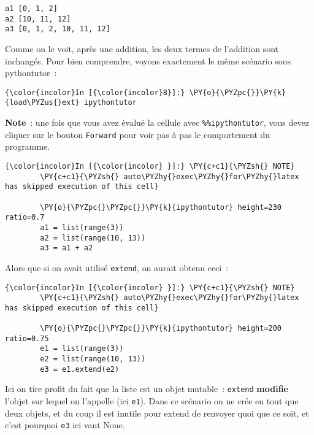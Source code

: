     \begin{Verbatim}[commandchars=\\\{\},frame=single,framerule=0.3mm,rulecolor=\color{cellframecolor}]
a1 [0, 1, 2]
a2 [10, 11, 12]
a3 [0, 1, 2, 10, 11, 12]
\end{Verbatim}

    Comme on le voit, après une addition, les deux termes de l'addition sont
inchangés. Pour bien comprendre, voyons exactement le même scénario sous
pythontutor~:

    \begin{Verbatim}[commandchars=\\\{\},frame=single,framerule=0.3mm,rulecolor=\color{cellframecolor}]
{\color{incolor}In [{\color{incolor}8}]:} \PY{o}{\PYZpc{}}\PY{k}{load\PYZus{}ext} ipythontutor
\end{Verbatim}


    \textbf{Note}~: une fois que vous avez évalué la cellule avec
\texttt{\%\%ipythontutor}, vous devez cliquer sur le bouton
\texttt{Forward} pour voir pas à pas le comportement du programme.

    \begin{Verbatim}[commandchars=\\\{\},frame=single,framerule=0.3mm,rulecolor=\color{cellframecolor}]
{\color{incolor}In [{\color{incolor} }]:} \PY{c+c1}{\PYZsh{} NOTE}
        \PY{c+c1}{\PYZsh{} auto\PYZhy{}exec\PYZhy{}for\PYZhy{}latex has skipped execution of this cell}
        
        \PY{o}{\PYZpc{}\PYZpc{}}\PY{k}{ipythontutor} height=230 ratio=0.7
        a1 = list(range(3))
        a2 = list(range(10, 13))
        a3 = a1 + a2
\end{Verbatim}


    Alors que si on avait utilisé \texttt{extend}, on aurait obtenu ceci~:

    \begin{Verbatim}[commandchars=\\\{\},frame=single,framerule=0.3mm,rulecolor=\color{cellframecolor}]
{\color{incolor}In [{\color{incolor} }]:} \PY{c+c1}{\PYZsh{} NOTE}
        \PY{c+c1}{\PYZsh{} auto\PYZhy{}exec\PYZhy{}for\PYZhy{}latex has skipped execution of this cell}
        
        \PY{o}{\PYZpc{}\PYZpc{}}\PY{k}{ipythontutor} height=200 ratio=0.75
        e1 = list(range(3))
        e2 = list(range(10, 13))
        e3 = e1.extend(e2)
\end{Verbatim}


    Ici on tire profit du fait que la liste est un objet mutable~:
\texttt{extend} \textbf{modifie} l'objet sur lequel on l'appelle (ici
\texttt{e1}). Dans ce scénario on ne crée en tout que deux objets, et du
coup il est inutile pour extend de renvoyer quoi que ce soit, et c'est
pourquoi \texttt{e3} ici vaut None.

